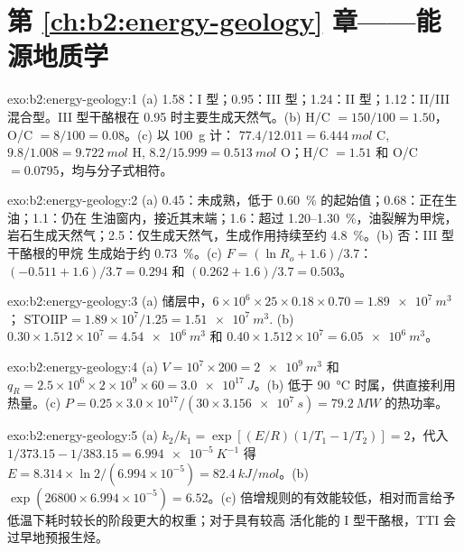 \section*{第 \ref{ch:b2:energy-geology} 章——能源地质学}

\begin{solution}{exo:b2:energy-geology:1}
(a) 1.58：I 型；0.95：III 型；1.24：II 型；1.12：II/III 混合型。III 型干酪根在
 0.95 时主要生成天然气。(b) H/C $= 150/100 = 1.50$，O/C $= 8/100 = 0.08$。(c) 以 \qty{100}{g} 计：
$77.4/12.011 = \qty{6.444}{mol}$ C, $9.8/1.008 = \qty{9.722}{mol}$ H, $8.2/15.999 =
\qty{0.513}{mol}$ O；H/C $= 1.51$ 和 O/C $= 0.0795$，均与分子式相符。
\end{solution}

\begin{solution}{exo:b2:energy-geology:2}
(a) 0.45：未成熟，低于 \qty{0.60}{\percent} 的起始值；0.68：正在生油；1.1：仍在
生油窗内，接近其末端；1.6：超过 1.20--\qty{1.30}{\percent}，油裂解为甲烷，
岩石生成天然气；2.5：仅生成天然气，生成作用持续至约 \qty{4.8}{\percent}。(b) 否：III 型干酪根的甲烷
生成始于约 \qty{0.73}{\percent}。(c) $F = (\ln R_o + 1.6)/3.7$：$(-0.511 +
1.6)/3.7 = 0.294$ 和 $(0.262 + 1.6)/3.7 = 0.503$。
\end{solution}

\begin{solution}{exo:b2:energy-geology:3}
(a) 储层中，$6 \times 10^6 \times 25 \times 0.18 \times 0.70 = \qty{1.89e7}{m^3}$；
$\mathrm{STOIIP} = 1.89 \times 10^7/1.25 = \qty{1.51e7}{m^3}$. (b) $0.30 \times 1.512 \times 10^7 =
\qty{4.54e6}{m^3}$ 和 $0.40 \times 1.512 \times 10^7 = \qty{6.05e6}{m^3}$。
\end{solution}

\begin{solution}{exo:b2:energy-geology:4}
(a) $V = 10^7 \times 200 = \qty{2e9}{m^3}$ 和 $q_R = 2.5 \times 10^6 \times 2 \times 10^9 \times 60
= \qty{3.0e17}{J}$。(b) 低于 \qty{90}{\celsius} 时属，供直接利用
热量。(c) $P = 0.25 \times 3.0 \times 10^{17}/(30 \times \qty{3.156e7}{s}) = \qty{79.2}{MW}$ 的热功率。
\end{solution}

\begin{solution}{exo:b2:energy-geology:5}
(a) $k_2/k_1 = \exp[(E/R)(1/T_1 - 1/T_2)] = 2$，代入 $1/373.15 - 1/383.15 = \qty{6.994e-5}{K^{-1}}$
得 $E = 8.314 \times \ln 2/(6.994 \times 10^{-5}) = \qty{82.4}{kJ/mol}$。(b) $\exp(26800 \times
6.994 \times 10^{-5}) = 6.52$。(c) 倍增规则的有效能较低，相对而言给予
低温下耗时较长的阶段更大的权重；对于具有较高
活化能的 I 型干酪根，TTI 会过早地预报生烃。
\end{solution}

